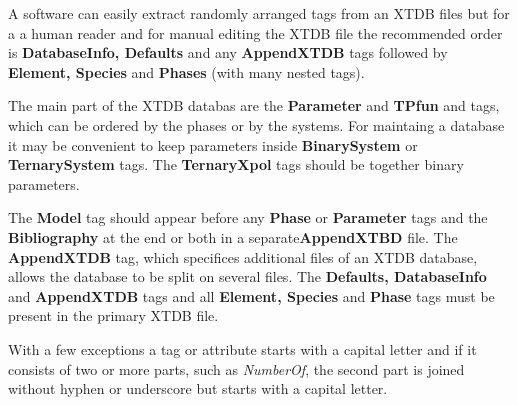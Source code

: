 \documentclass{article}
\begin{document}
\begin{appendices}
A software can easily extract randomly arranged tags from an XTDB
files but for a a human reader and for manual editing the XTDB file
the recommended order is {\bf DatabaseInfo, Defaults} and any {\bf
  AppendXTDB} tags followed by {\bf Element, Species} and {\bf Phases}
(with many nested tags).

The main part of the XTDB databas are the {\bf Parameter} and {\bf
  TPfun} and tags, which can be ordered by the phases or by the
systems.  For maintaing a database it may be convenient to keep
parameters inside {\bf BinarySystem} or {\bf TernarySystem} tags.  The
{\bf TernaryXpol} tags should be together binary parameters.

The {\bf Model} tag should appear before any {\bf Phase} or {\bf
  Parameter} tags and the {\bf Bibliography} at the end or both in a
separate{\bf AppendXTBD} file.  The {\bf AppendXTDB} tag, which
specifices additional files of an XTDB database, allows the database to
be split on several files.  The {\bf Defaults, DatabaseInfo} and {\bf
  AppendXTDB} tags and all {\bf Element, Species} and {\bf Phase} tags
must be present in the primary XTDB file.

With a few exceptions a tag or attribute starts with a capital letter
and if it consists of two or more parts, such as {\em NumberOf}, the
second part is joined without hyphen or underscore but starts with a
capital letter. 

\end{appendices}
\end{document}
